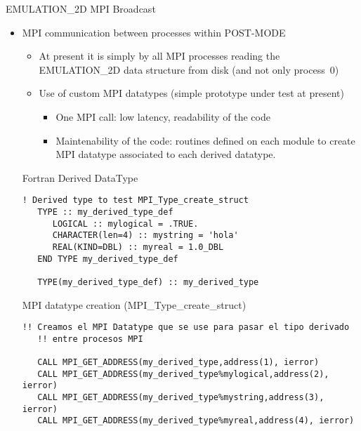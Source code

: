 \begin{frame}{EMULATION\_2D MPI Broadcast}
\begin{itemize}
\framebreak %

\item MPI communication between processes within POST-MODE
  \begin{itemize}
  \item At present it is simply by all MPI processes reading the
    EMULATION\_2D data structure from disk (and not only process~0)

  \item \alert{Use of custom MPI datatypes} (simple prototype under
    test at present)
    \begin{itemize}
    \item One MPI call: low latency, readability of the code
    \item Maintenability of the code: routines defined on each module
      to create MPI datatype associated to each derived datatype.
    \end{itemize}
  \end{itemize}

  
   \framebreak %

   \begin{block}{Fortran Derived DataType}
     \begin{lstlisting}[style=myFORTRANcodeS,basicstyle=\ttfamily\footnotesize]
   ! Derived type to test MPI_Type_create_struct
   TYPE :: my_derived_type_def
      LOGICAL :: mylogical = .TRUE.
      CHARACTER(len=4) :: mystring = 'hola'
      REAL(KIND=DBL) :: myreal = 1.0_DBL
   END TYPE my_derived_type_def

   TYPE(my_derived_type_def) :: my_derived_type   
     \end{lstlisting}
   \end{block}
   
   \framebreak %
   
\begin{block}{MPI datatype creation (MPI\_Type\_create\_struct) \insertcontinuationtext}   
\begin{lstlisting}[style=myFORTRANcodeS,basicstyle=\ttfamily\footnotesize]
   !! Creamos el MPI Datatype que se use para pasar el tipo derivado
   !! entre procesos MPI

   CALL MPI_GET_ADDRESS(my_derived_type,address(1), ierror)
   CALL MPI_GET_ADDRESS(my_derived_type%mylogical,address(2), ierror)
   CALL MPI_GET_ADDRESS(my_derived_type%mystring,address(3), ierror)
   CALL MPI_GET_ADDRESS(my_derived_type%myreal,address(4), ierror)


\end{lstlisting}
\end{block}
\end{itemize}
\end{frame}

